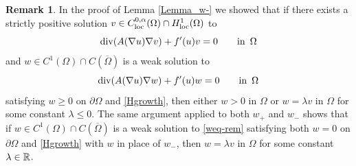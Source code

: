 \documentclass[10 pt,a4paper]{article}
\theoremstyle{definition}
\newtheorem{remark}[definition]{Remark}
\begin{document}
\begin{remark} \label{rem-Lemma_w-}
	In the proof of Lemma \ref{Lemma_w-} we showed that if there exists a strictly positive solution $v\in C^{0,\alpha}_{\mathrm{loc}}(\Omega) \cap H^1_{\mathrm{loc}}(\Omega)$ to
	\[
		\mathrm{div}(A(\nabla u)\nabla v) + f'(u)v = 0 \qquad \text{in } \, \Omega
	\]
	and $w\in C^1(\Omega)\cap C(\overline{\Omega})$ is a weak solution to
	\begin{equation} \label{weq-rem}
		\mathrm{div}(A(\nabla u)\nabla w) + f'(u)w = 0 \qquad \text{in } \, \Omega
	\end{equation}
	satisfying $w\geq 0$ on $\partial\Omega$ and \eqref{Hgrowth}, then either $w > 0$ in $\Omega$ or $w = \lambda v$ in $\Omega$ for some constant $\lambda\leq 0$. 
	The same argument applied to both $w_+$ and $w_-$ shows that if $w\in C^1(\Omega)\cap C(\overline{\Omega})$ is a weak solution to \eqref{weq-rem} satisfying both $w=0$ on $\partial \Omega$ and \eqref{Hgrowth} with $w$ in place of $w_-$, then $w = \lambda v$ in $\Omega$ for some constant $\lambda\in\mathbb R$.
\end{remark}
\end{document}
